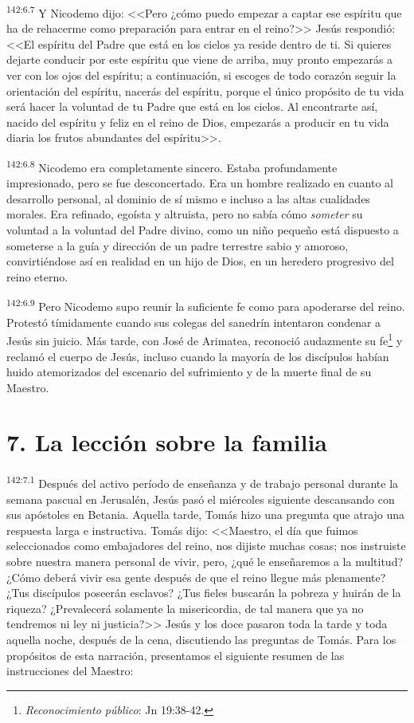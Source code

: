 \par 
\textsuperscript{142:6.7} Y Nicodemo dijo: <<Pero ¿cómo puedo empezar a captar ese espíritu que ha de rehacerme como preparación para entrar en el reino?>> Jesús respondió: <<El espíritu del Padre que está en los cielos ya reside dentro de ti. Si quieres dejarte conducir por este espíritu que viene de arriba, muy pronto empezarás a ver con los ojos del espíritu; a continuación, si escoges de todo corazón seguir la orientación del espíritu, nacerás del espíritu, porque el único propósito de tu vida será hacer la voluntad de tu Padre que está en los cielos. Al encontrarte así, nacido del espíritu y feliz en el reino de Dios, empezarás a producir en tu vida diaria los frutos abundantes del espíritu>>.

\par 
\textsuperscript{142:6.8} Nicodemo era completamente sincero. Estaba profundamente impresionado, pero se fue desconcertado. Era un hombre realizado en cuanto al desarrollo personal, al dominio de sí mismo e incluso a las altas cualidades morales. Era refinado, egoísta y altruista, pero no sabía cómo \textit{someter} su voluntad a la voluntad del Padre divino, como un niño pequeño está dispuesto a someterse a la guía y dirección de un padre terrestre sabio y amoroso, convirtiéndose así en realidad en un hijo de Dios, en un heredero progresivo del reino eterno.

\par 
\textsuperscript{142:6.9} Pero Nicodemo supo reunir la suficiente fe como para apoderarse del reino. Protestó tímidamente cuando sus colegas del sanedrín intentaron condenar a Jesús sin juicio. Más tarde, con José de Arimatea, reconoció audazmente su fe\footnote{\textit{Reconocimiento público}: Jn 19:38-42.} y reclamó el cuerpo de Jesús, incluso cuando la mayoría de los discípulos habían huido atemorizados del escenario del sufrimiento y de la muerte final de su Maestro.

\section*{7. La lección sobre la familia}
\par 
\textsuperscript{142:7.1} Después del activo período de enseñanza y de trabajo personal durante la semana pascual en Jerusalén, Jesús pasó el miércoles siguiente descansando con sus apóstoles en Betania. Aquella tarde, Tomás hizo una pregunta que atrajo una respuesta larga e instructiva. Tomás dijo: <<Maestro, el día que fuimos seleccionados como embajadores del reino, nos dijiste muchas cosas; nos instruiste sobre nuestra manera personal de vivir, pero, ¿qué le enseñaremos a la multitud? ¿Cómo deberá vivir esa gente después de que el reino llegue más plenamente? ¿Tus discípulos poseerán esclavos? ¿Tus fieles buscarán la pobreza y huirán de la riqueza? ¿Prevalecerá solamente la misericordia, de tal manera que ya no tendremos ni ley ni justicia?>> Jesús y los doce pasaron toda la tarde y toda aquella noche, después de la cena, discutiendo las preguntas de Tomás. Para los propósitos de esta narración, presentamos el siguiente resumen de las instrucciones del Maestro:

